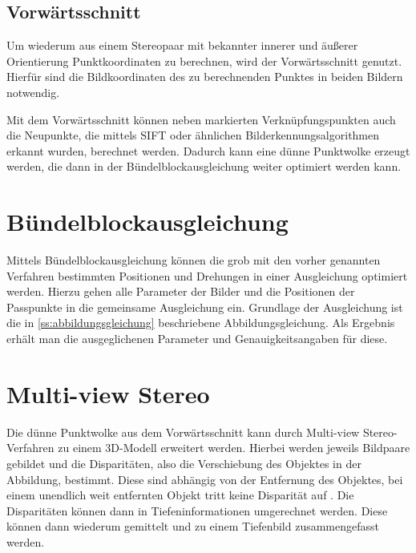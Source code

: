\documentclass[./00PhotoBox.tex]{subfiles}
\begin{document}
\subsection{Vorwärtsschnitt}
Um wiederum aus einem Stereopaar mit bekannter innerer und äußerer Orientierung Punktkoordinaten zu berechnen, wird der Vorwärtsschnitt genutzt. Hierfür sind die Bildkoordinaten des zu berechnenden Punktes in beiden Bildern notwendig.

Mit dem Vorwärts\-schnitt können neben markierten Verknüpfungspunkten auch die Neupunkte, die mittels SIFT oder ähnlichen Bild\-erkennungs\-algorithmen erkannt wurden, berechnet werden. Dadurch kann eine dünne Punktwolke erzeugt werden, die dann in der Bündel\-block\-ausgleichung weiter optimiert werden kann.

\section{Bündelblockausgleichung}
\label{s:buendelblock}
Mittels Bündelblockausgleichung können die grob mit den vorher genannten Verfahren bestimmten Positionen und Drehungen in einer Ausgleichung optimiert werden. Hierzu gehen alle Parameter der Bilder und die Positionen der Passpunkte in die gemeinsame Ausgleichung ein. Grundlage der Ausgleichung ist die in \autoref{ss:abbildungsgleichung} beschriebene Abbildungsgleichung. Als Ergebnis erhält man die ausgeglichenen Parameter und Genauigkeitsangaben für diese. \citep[S. 343ff]{luhmann}


\section{Multi-view Stereo}
Die dünne Punktwolke aus dem Vorwärtsschnitt kann durch Multi-view Stereo-Verfahren zu einem 3D-Modell erweitert werden. Hierbei werden jeweils Bildpaare gebildet und die Disparitäten, also die Verschiebung des Objektes in der Abbildung, bestimmt. Diese sind abhängig von der Entfernung des Objektes, bei einem unendlich weit entfernten Objekt tritt keine Disparität auf \citep[S. 313]{luhmann}. Die Disparitäten können dann in Tiefeninformationen umgerechnet werden. Diese können dann wiederum gemittelt und zu einem Tiefenbild zusammengefasst werden. \citep[S. 505]{luhmann}
\end{document}
